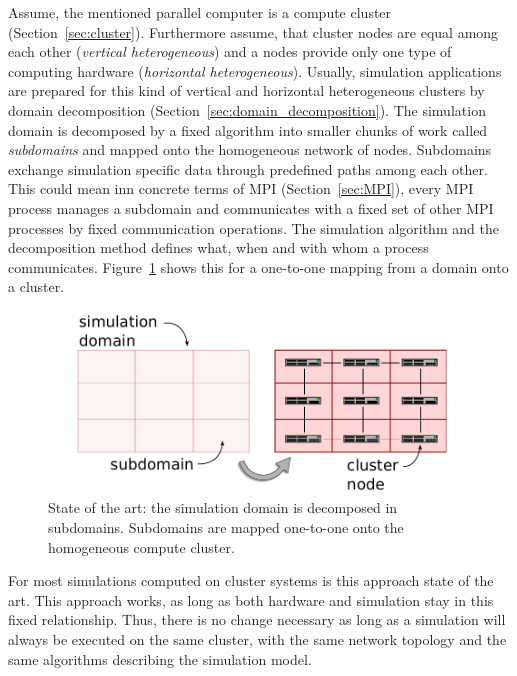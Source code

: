 Assume, the mentioned parallel computer is a compute cluster
(Section~\ref{sec:cluster}). Furthermore assume, that cluster nodes
are equal among each other (\emph{vertical heterogeneous}) and a nodes
provide only one type of computing hardware (\emph{horizontal
  heterogeneous}). Usually, simulation applications are prepared for
this kind of vertical and horizontal heterogeneous clusters by domain
decomposition (Section~\ref{sec:domain_decomposition}). The simulation
domain is decomposed by a fixed algorithm into smaller chunks of work
called \emph{subdomains} and mapped onto the homogeneous network of
nodes. Subdomains exchange simulation specific data through predefined
paths among each other. This could mean inn concrete terms of MPI
(Section~\ref{sec:MPI}), every MPI process manages a subdomain and
communicates with a fixed set of other MPI processes by fixed
communication operations. The simulation algorithm and the
decomposition method defines what, when and with whom a process
communicates.  Figure~\ref{fig:state_of_the_art} shows this for a
one-to-one mapping from a domain onto a cluster.

\begin{figure}[H]
  \centering \includegraphics[width=\textwidth]{graphics/30_state_of_the_art}
  \caption{State of the art: the simulation domain is decomposed in
    subdomains. Subdomains are mapped one-to-one onto the homogeneous
    compute cluster.}
  \label{fig:state_of_the_art}
\end{figure}


For most simulations computed on cluster systems is this approach
state of the art.  This approach works, as long as both hardware and
simulation stay in this fixed relationship. Thus, there is no change
necessary as long as a simulation will always be executed on the same
cluster, with the same network topology and the same algorithms
describing the simulation model.

